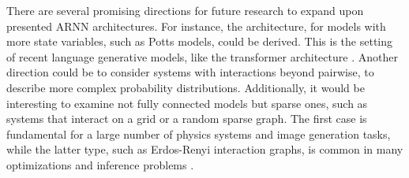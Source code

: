 \documentclass[aps,physrev,10pt,floatfix,reprint]{revtex4-2}
\begin{document}
There are several promising directions for future research to expand upon presented ARNN architectures. For instance, the architecture, for models with more state variables, such as Potts models, could be derived. This is the setting of recent language generative models, like the transformer architecture \cite{https://doi.org/10.48550/arxiv.2005.14165}. Another direction could be to consider systems with interactions beyond pairwise, to describe more complex probability distributions. Additionally, it would be interesting to examine not fully connected models but sparse ones, such as systems that interact on a grid or a random sparse graph. The first case is fundamental for a large number of physics systems and image generation tasks, while the latter type, such as Erdos-Renyi interaction graphs, is common in many optimizations \cite{doi:10.1126/science.1073287} and inference problems \cite{Biazzo2022}. 
%

\end{document}
